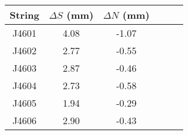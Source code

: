 \begin{tabular}{cccccc}
\toprule
String &  $\Delta S$ (mm) &  $\Delta N$ (mm) \\
\midrule
 J4601 &             4.08 &            -1.07 \\
 J4602 &             2.77 &            -0.55 \\
 J4603 &             2.87 &            -0.46 \\
 J4604 &             2.73 &            -0.58 \\
 J4605 &             1.94 &            -0.29 \\
 J4606 &             2.90 &            -0.43 \\
\bottomrule
\end{tabular}

